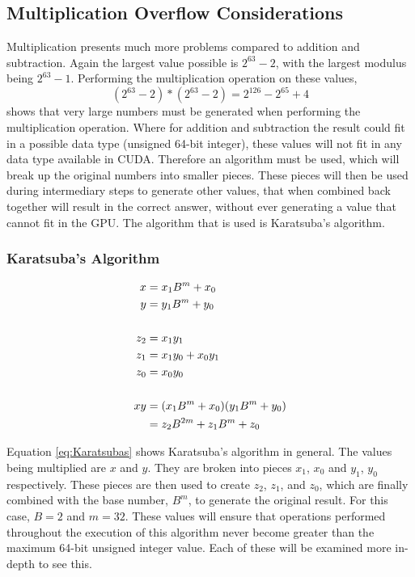 \subsection{Multiplication Overflow Considerations}
Multiplication presents much more problems compared to addition and subtraction. Again the largest value possible is $2^{63} - 2$, with the largest modulus being $2^{63} - 1$. Performing the multiplication operation on these values, 
\begin{equation} \label{eq:mul}
(2^{63} - 2) * (2^{63} - 2) = 2^{126} - 2^{65} + 4
\end{equation}
shows that very large numbers must be generated when performing the multiplication operation. Where for addition and subtraction the result could fit in a possible data type (unsigned 64-bit integer), these values will not fit in any data type available in CUDA. Therefore an algorithm must be used, which will break up the original numbers into smaller pieces. These pieces will then be used during intermediary steps to generate other values, that when combined back together will result in the correct answer, without ever generating a value that cannot fit in the GPU. The algorithm that is used is Karatsuba's algorithm. 

\subsubsection{Karatsuba's Algorithm}
\begin{equation} \label{eq:Karatsubas}
\begin{split}
x &= x_1 B^m + x_0\\
y &= y_1 B^m + y_0 \cr\\
z_2 &= x_1 y_1\\
z_1 &= x_1 y_0 + x_0 y_1\\
z_0 &= x_0 y_0 \cr\\
xy & = (x_1 B^m + x_0)(y_1 B^m + y_0)\\
 & = z_2 B^{2m} + z_1 B^{m} + z_0
\end{split}
\end{equation}

Equation \ref{eq:Karatsubas} shows Karatsuba's algorithm in general. The values being multiplied are $x$ and $y$. They are broken into pieces $x_1$, $x_0$ and $y_1$, $y_0$ respectively. These pieces are then used to create $z_2$, $z_1$, and $z_0$, which are finally combined with the base number, $B^m$, to generate the original result. For this case, $B=2$ and $m=32$. These values will ensure that operations performed throughout the execution of this algorithm never become greater than the maximum 64-bit unsigned integer value. Each of these will be examined more in-depth to see this.

